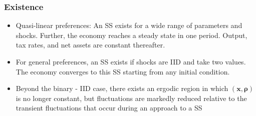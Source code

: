 \documentclass{beamer}
\begin{document}
\begin{frame}
\frametitle{Existence}
\begin{itemize}
 \item Quasi-linear preferences: An SS exists for a wide range of parameters and shocks.
 Further, the economy reaches a steady state in one period. Output, tax rates,  and net assets are constant thereafter.
 \item For general preferences, an SS exists if shocks are IID and take two values. The economy converges to this SS starting from any initial condition.
 \item Beyond the binary - IID case, there exists an ergodic region in which $\left( \bm{x},\bm{\rho} \right) $ is no longer constant, but  fluctuations are markedly reduced relative to the transient fluctuations that occur during an approach to  a SS
\end{itemize}
\end{frame}
\end{document}

